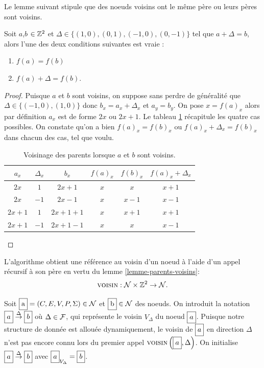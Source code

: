 Le lemme suivant stipule que des noeuds voisins ont le même père ou leurs pères sont voisins.

\begin{lemma}\label{lemme-parents-voisins}
Soit $a$,$b$ $\in \mathbb{Z}^2$ et $\Delta\in \{{(1,0),(0,1),(−1,0),(0,−1)}\}$ tel que $a+\Delta=b$, alors l'une des deux conditions suivantes est vraie : 
\begin{enumerate}
\item $f(a) = f(b)$
\item $f(a)+\Delta = f(b)$.
\end{enumerate}

\end{lemma}
\begin{proof}
Puisque $a$ et $b$ sont voisins, on suppose sans perdre de généralité que $\Delta \in \{(-1,0),(1,0)\}$ donc $b_x=a_x + \Delta_x$ et $a_y=b_y$. On pose $x = f(a)_x$ alors par définition $a_x$ est de forme $2x$ ou $2x+1$. Le tableau \ref{voisinage-parents} récapitule les quatre cas possibles. On constate qu'on a bien $f(a)_x = f(b)_x$ ou $f(a)_x+\Delta_x = f(b)_x$ dans chacun des cas, tel que voulu.

\begin{table}
\centering
\begin{tabular}{|c|c|c|c|c|c|}
\hline
$a_x$ & $\Delta_x$ & $b_x$ & $f(a)_x$ & $f(b)_x$ & $f(a)_x+\Delta_x$ \\
\hline
$2x$ & $1$ & $2x + 1$ & $x$ & $x$ & $x+1$ \\
$2x$ & $-1$ & $2x - 1$ & $x$ & $x-1$ & $x-1$ \\
$2x+1$ & $1$ & $2x+1 + 1$ & $x$ & $x+1$ & $x+1$ \\
$2x+1$ & $-1$ & $2x+1 - 1$ & $x$ & $x$ & $x-1$ \\
\hline
\end{tabular}
\caption{Voisinage des parents lorsque $a$ et $b$ sont voisins.}\label{voisinage-parents}
\end{table}

\end{proof}

L'algorithme \voisin obtient une référence au voisin d'un noeud à l'aide d'un appel récursif à son père en vertu du lemme \ref{lemme-parents-voisins}:
$$\text{\scshape voisin} : \mathcal{N} \times \mathbb{Z}^2 \rightarrow \mathcal{N}\text{.}$$

Soit $\Node{a}=(C, E, V, P, \Sigma)\in \Nodes$ et $\Node{b}\in \Nodes$ des noeuds. 
On introduit la notation $\Node{$a$} \stackrel{\Delta}{\rightarrow} \Node{$b$}$ où $\Delta \in \mathcal{F}$, qui représente 
le voisin $V_\Delta$ du noeud $\Node{$a$}$. Puisque notre structure de donnée est allouée 
dynamiquement, le voisin de $\Node{$a$}$ en direction $\Delta$ 
n'est pas encore connu lors du premier appel $\voisin\left(\Node{$a$}, \Delta\right)$. 
On initialise $\Node{$a$} \stackrel{\Delta}{\rightarrow} \Node{$b$}$ avec $\Node{$a$}_{V_\Delta} = \Node{$b$}$.

